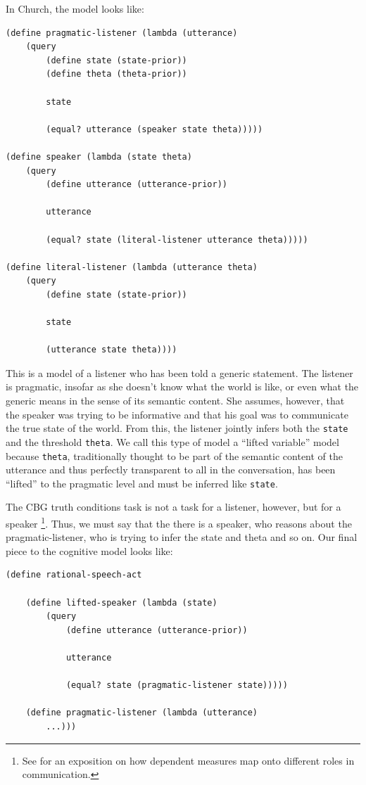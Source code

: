 \documentclass[10pt,letterpaper]{article}
\begin{document}
In Church, the model looks like:

\begin{lstlisting}
(define pragmatic-listener (lambda (utterance)
	(query
		(define state (state-prior))
		(define theta (theta-prior))
			
		state
			
		(equal? utterance (speaker state theta)))))
			
(define speaker (lambda (state theta)
	(query
		(define utterance (utterance-prior))
			
		utterance
			
		(equal? state (literal-listener utterance theta)))))
			
(define literal-listener (lambda (utterance theta)
	(query
		(define state (state-prior))
			
		state
			
		(utterance state theta))))
\end{lstlisting}

This is a model of a listener who has been told a generic statement. The listener is pragmatic, insofar as she doesn't know what the world is like, or even what the generic means in the sense of its semantic content. She assumes, however, that the speaker was trying to be informative and that his goal was to communicate the true state of the world. From this, the listener jointly infers both the \lstinline{state} and the threshold \lstinline{theta}. We call this type of model a ``lifted variable'' model because \lstinline{theta}, traditionally thought to be part of the semantic content of the utterance and thus perfectly transparent to all in the conversation, has been ``lifted'' to the pragmatic level and must be inferred like \lstinline{state}.

The CBG truth conditions task is not a task for a listener, however, but for a speaker \footnote{See  for an exposition on how dependent measures map onto different roles in communication.}. Thus, we must say that the there is a speaker, who reasons about the pragmatic-listener, who is trying to infer the state and theta and so on. Our final piece to the cognitive model looks like:

\begin{lstlisting}
(define rational-speech-act

	(define lifted-speaker (lambda (state)
		(query
			(define utterance (utterance-prior))
			
			utterance
			
			(equal? state (pragmatic-listener state)))))	
			
	(define pragmatic-listener (lambda (utterance)
		...)))
\end{lstlisting}
\end{document}
